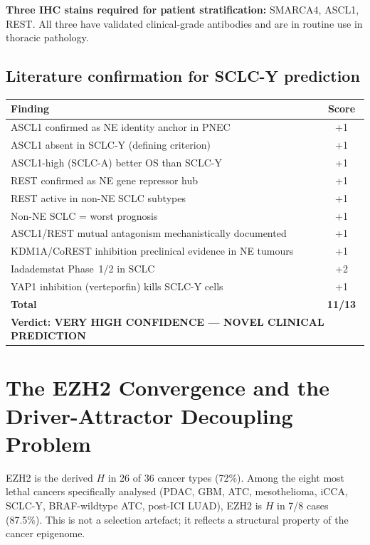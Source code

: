 \documentclass[11pt, a4paper]{article}
\begin{document}
\begin{novelenv}
\medskip
\textbf{Three IHC stains required for patient
stratification:} SMARCA4, ASCL1, REST.
All three have validated clinical-grade antibodies
and are in routine use in thoracic pathology.
\end{novelenv}

\subsection{Literature confirmation for SCLC-Y prediction}

\begin{center}
\begin{tabular}{p{9.0cm}c}
\toprule
\textbf{Finding} & \textbf{Score} \\
\midrule
ASCL1 confirmed as NE identity anchor in PNEC & +1 \\
ASCL1 absent in SCLC-Y (defining criterion) & +1 \\
ASCL1-high (SCLC-A) better OS than SCLC-Y~\cite{gay2021} & +1 \\
REST confirmed as NE gene repressor hub~\cite{rest2025} & +1 \\
REST active in non-NE SCLC subtypes~\cite{rest2025} & +1 \\
Non-NE SCLC = worst prognosis~\cite{gay2021} & +1 \\
ASCL1/REST mutual antagonism mechanistically documented & +1 \\
KDM1A/CoREST inhibition preclinical evidence in NE tumours & +1 \\
Iadademstat Phase~1/2 in SCLC~\cite{fiedler2022} & +2 \\
YAP1 inhibition (verteporfin) kills SCLC-Y cells~\cite{wu2023} & +1 \\
\midrule
\textbf{Total} & \textbf{11/13} \\
\multicolumn{2}{l}{\textbf{Verdict: VERY HIGH CONFIDENCE ---
NOVEL CLINICAL PREDICTION}} \\
\bottomrule
\end{tabular}
\end{center}

\section{The EZH2 Convergence and the
         Driver-Attractor Decoupling Problem}
\label{sec:ezh2}

EZH2 is the derived $H$ in 26 of 36 cancer types (72\%).
Among the eight most lethal cancers specifically analysed
(PDAC, GBM, ATC, mesothelioma, iCCA, SCLC-Y, BRAF-wildtype
ATC, post-ICI LUAD), EZH2 is $H$ in 7/8 cases (87.5\%).
This is not a selection artefact; it reflects a structural
property of the cancer epigenome.
\end{document}
